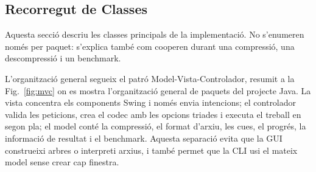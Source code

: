 \documentclass[conference,compsoc]{IEEEtran}
\begin{document}
\subsection{Recorregut de Classes}

Aquesta secció descriu les classes principals de la implementació. No
s'enumeren només per paquet: s'explica també com cooperen durant una
compressió, una descompressió i un benchmark.

L'organització general segueix el patró Model-Vista-Controlador, resumit a
la Fig.~\ref{fig:mvc} on es mostra l'organització general de paquets del projecte Java.
La vista concentra els components Swing i només envia
intencions; el controlador valida les peticions, crea el codec amb les
opcions triades i executa el treball en segon pla; el model conté la
compressió, el format d'arxiu, les cues, el progrés, la informació de
resultat i el benchmark. Aquesta separació evita que la GUI construeixi
arbres o interpreti arxius, i també permet que la CLI usi el mateix model
sense crear cap finestra.
\end{document}
